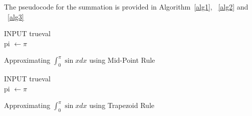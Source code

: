 \documentclass[titlepage, 11pt]{article}
\begin{document}
The pseudocode for the summation is provided in Algorithm~\ref{alg1}, ~\ref{alg2} and ~\ref{alg3}
\begin{center}
\begin{algorithm}[H]\label{alg1}

\SetAlgoLined

INPUT trueval \\ 
pi $\gets \pi$ \\

 \caption{Approximating  $\int_{0}^{\pi} \sin{x} dx$ using Mid-Point Rule}
\end{algorithm}    
\end{center}

\begin{center}
\begin{algorithm}[H]\label{alg2}

\SetAlgoLined

INPUT trueval \\ 
pi $\gets \pi$ \\

 \caption{Approximating  $\int_{0}^{\pi} \sin{x} dx$ using Trapezoid Rule}
\end{algorithm}    
\end{center}
\end{document}
